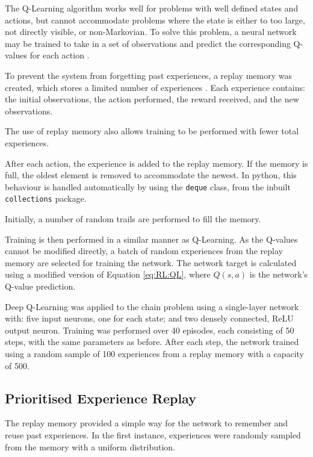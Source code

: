 The Q-Learning algorithm works well for problems with well defined states and
actions, but cannot accommodate problems where the state is either to too large,
not directly visible, or non-Markovian.
To solve this problem, a neural network may be trained to take in a set of
observations and predict the corresponding Q-values for each action
\citep{Lin:1990:Self}.

To prevent the system from forgetting past experiences, a replay memory was
created, which stores a limited number of experiences \citep{Lin:1992:Self}.
Each experience contains: the initial observations, the action performed,
the reward received, and the new observations.

The use of replay memory also allows training to be performed with fewer
total experiences.

After each action, the experience is added to the replay memory.
If the memory is full, the oldest element is removed to accommodate the newest.
In python, this behaviour is handled automatically by using the \texttt{deque}
class, from the inbuilt \texttt{collections} package.

Initially, a number of random trails are performed to fill the memory.

Training is then performed in a similar manner as Q-Learning.
As the Q-values cannot be modified directly, a batch of random experiences from
the replay memory are selected for training the network.
The network target is calculated using a modified version of Equation
\ref{eq:RL:QL}, where $Q(s,a)$ is the network's Q-value prediction.

Deep Q-Learning was applied to the chain problem using a single-layer network
with: five input neurons, one for each state; and two densely connected, ReLU
output neuron.
Training was performed over 40 episodes, each consisting of 50 steps, with the
same parameters as before.
After each step, the network trained using a random sample of 100 experiences
from a replay memory with a capacity of 500.



\subsection{Prioritised Experience Replay}

The replay memory provided a simple way for the network to remember and reuse
past experiences.
In the first instance, experiences were randomly sampled from the memory with a
uniform distribution.

